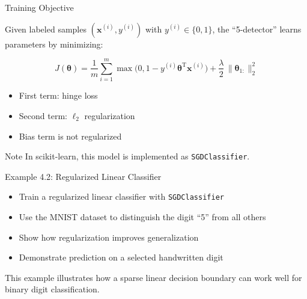 \documentclass[aspectratio=169]{beamer}
\begin{document}

\begin{frame}{Training Objective}
	
	Given labeled samples $(\mathbf{x}^{(i)}, y^{(i)})$ with $y^{(i)} \in \{0,1\}$, the ``5-detector'' learns parameters by minimizing:
	
	\[
	J(\boldsymbol{\theta}) =
	\frac{1}{m}\sum_{i=1}^{m}
	\max\bigl(0, 1 - y^{(i)}\boldsymbol{\theta}^{\text{T}}\mathbf{x}^{(i)}\bigr)
	+
	\frac{\lambda}{2}\,\lVert \boldsymbol{\theta}_{1:} \rVert_2^2
	\]
	
	\vspace{0.5em}
	
	\begin{itemize}
		\item First term: hinge loss
		\item Second term: $\ell_2$ regularization
		\item Bias term is not regularized
	\end{itemize}
	
	\begin{exampleblock}{Note}
		In scikit-learn, this model is implemented as \texttt{SGDClassifier}.
	\end{exampleblock}
	
\end{frame}


\begin{frame}{Example 4.2: Regularized Linear Classifier}
	
	\begin{itemize}
		\item Train a regularized linear classifier with \texttt{SGDClassifier}
		\item Use the MNIST dataset to distinguish the digit ``5'' from all others
		\item Show how regularization improves generalization
		\item Demonstrate prediction on a selected handwritten digit
	\end{itemize}
	
	\vspace{0.5em}
	
	This example illustrates how a sparse linear decision boundary can work well for binary digit classification.
	
\end{frame}
\end{document}
